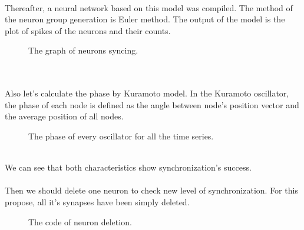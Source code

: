 \documentclass[draft]{article}
\newcommand\tab[1][1cm]{\hspace*{#1}}
\begin{document}
~\\
\tab Thereafter, a neural network based on this model was compiled. The method of the neuron group generation is Euler method. The output of the model is the plot of spikes of the neurons and their counts.
\begin{figure}[h]
\caption{The graph of neurons syncing.}
\label{ris:image}
\end{figure}\\
~\\
\tab Also let's calculate the phase by Kuramoto model. In the Kuramoto oscillator, the phase of each node is defined as the angle between node's position vector and the average position of all nodes.
\begin{figure}[h]
\caption{The phase of every oscillator for all the time series.}
\label{ris:image}
\end{figure}\\
\tab We can see that both characteristics show synchronization's success.\\
~\\
\newpage
\tab Then we should delete one neuron to check new level of synchronization. For this propose, all it's synapses have been simply deleted.
\begin{figure}[h]
\caption{The code of neuron deletion.}
\label{ris:image}
\end{figure}\\
\end{document}

